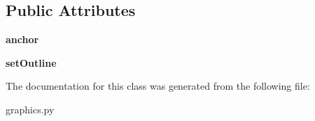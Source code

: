 \subsection*{Public Attributes}
\begin{DoxyCompactItemize}
\item 
\mbox{\label{classgraphics_1_1_text_a24a6cb5416b56cc809da0a358de69db7}} 
{\bfseries anchor}
\item 
\mbox{\label{classgraphics_1_1_text_a9b7d6fa2325a028c73778227d8f9ac99}} 
{\bfseries set\+Outline}
\end{DoxyCompactItemize}


The documentation for this class was generated from the following file\+:\begin{DoxyCompactItemize}
\item 
graphics.\+py\end{DoxyCompactItemize}
